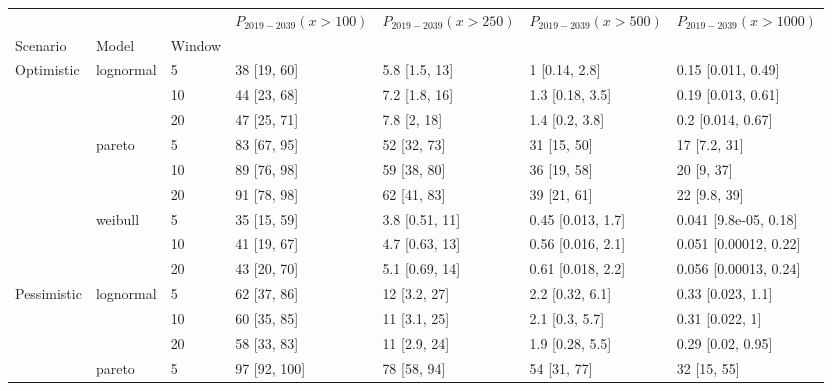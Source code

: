 \begin{tabular}{lllllll}
\toprule
           &         &    & $P_{2019-2039}(x>100)$ & $P_{2019-2039}(x>250)$ & $P_{2019-2039}(x>500)$ & $P_{2019-2039}(x>1000)$ \\
Scenario & Model & Window &                        &                        &                        &                         \\
\midrule
Optimistic & lognormal & 5  &            38 [19, 60] &          5.8 [1.5, 13] &          1 [0.14, 2.8] &      0.15 [0.011, 0.49] \\
           &         & 10 &            44 [23, 68] &          7.2 [1.8, 16] &        1.3 [0.18, 3.5] &      0.19 [0.013, 0.61] \\
           &         & 20 &            47 [25, 71] &            7.8 [2, 18] &         1.4 [0.2, 3.8] &       0.2 [0.014, 0.67] \\
           & pareto & 5  &            83 [67, 95] &            52 [32, 73] &            31 [15, 50] &            17 [7.2, 31] \\
           &         & 10 &            89 [76, 98] &            59 [38, 80] &            36 [19, 58] &              20 [9, 37] \\
           &         & 20 &            91 [78, 98] &            62 [41, 83] &            39 [21, 61] &            22 [9.8, 39] \\
           & weibull & 5  &            35 [15, 59] &         3.8 [0.51, 11] &      0.45 [0.013, 1.7] &   0.041 [9.8e-05, 0.18] \\
           &         & 10 &            41 [19, 67] &         4.7 [0.63, 13] &      0.56 [0.016, 2.1] &   0.051 [0.00012, 0.22] \\
           &         & 20 &            43 [20, 70] &         5.1 [0.69, 14] &      0.61 [0.018, 2.2] &   0.056 [0.00013, 0.24] \\
Pessimistic & lognormal & 5  &            62 [37, 86] &           12 [3.2, 27] &        2.2 [0.32, 6.1] &       0.33 [0.023, 1.1] \\
           &         & 10 &            60 [35, 85] &           11 [3.1, 25] &         2.1 [0.3, 5.7] &         0.31 [0.022, 1] \\
           &         & 20 &            58 [33, 83] &           11 [2.9, 24] &        1.9 [0.28, 5.5] &       0.29 [0.02, 0.95] \\
           & pareto & 5  &           97 [92, 100] &            78 [58, 94] &            54 [31, 77] &             32 [15, 55] \\

\end{tabular}
